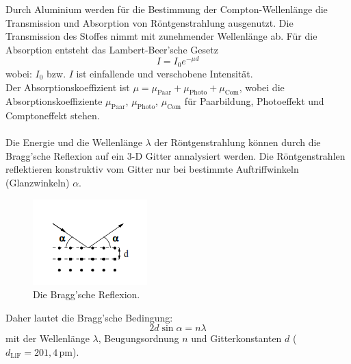  Durch Aluminium werden für die Bestimmung der Compton-Wellenlänge die Transmission und Absorption von Röntgenstrahlung ausgenutzt. 
Die Transmission des Stoffes nimmt mit zunehmender Wellenlänge ab.
Für die Absorption entsteht das Lambert-Beer'sche Gesetz
\begin{equation}
  I = I_0 e^{-\mu d}
\end{equation}
wobei: $I_0$ bzw. $I$ ist einfallende und verschobene Intensität.\\
       Der Absorptionskoeffizient ist \(\mu = \mu_\text{Paar}+ \mu_\text{Photo}+\mu_\text{Com}\), wobei die Absorptionskoeffiziente $\mu_\text{Paar}$, $\mu_\text{Photo}$, $\mu_\text{Com}$ für Paarbildung, Photoeffekt und Comptoneffekt stehen.

\paragraph{}
Die Energie und die Wellenlänge $\lambda$ der Röntgenstrahlung können durch die Bragg’sche Reflexion auf ein 3-D Gitter annalysiert werden.
Die Röntgenstrahlen reflektieren konstruktiv vom Gitter nur bei bestimmte Auftriffwinkeln (Glanzwinkeln) $\alpha$.
 \begin{figure}[H]
    \centering
    \includegraphics{Gitterkonstanten.png}
    \caption{Die Bragg’sche Reflexion.}
    \label{fig:Gitterkonstanten}
  \end{figure}
Daher lautet die Bragg’sche Bedingung:
\begin{equation}
  2d \sin \alpha = n \lambda 
\end{equation}
mit der Wellenlänge $\lambda$, Beugungsordnung $n$ und Gitterkonstanten $d$ (\(d_\text{LiF}=201,4\, \mathrm{pm} \)). 
\cite{AL}
\newpage

